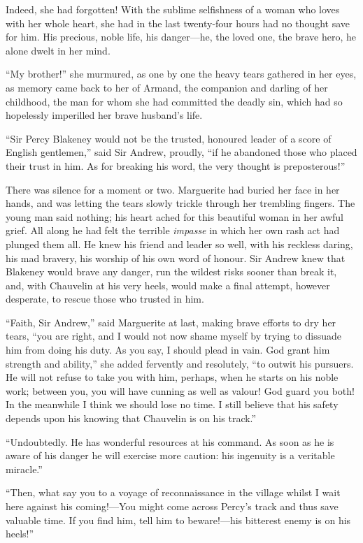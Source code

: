 \documentclass[paper=a5,BCOR=7mm,twoside,DIV=calc,12pt,usegeometry,chapterprefix,endperiod,headings=big]{scrbook}
\begin{document}
Indeed, she had forgotten! With the sublime selfishness of a woman who loves with her whole heart, she had in the last twenty-four hours had no thought save for him. His precious, noble life, his danger---he, the loved one, the brave hero, he alone dwelt in her mind.

\enquote{My brother!} she murmured, as one by one the heavy tears gathered in her eyes, as memory came back to her of Armand, the companion and darling of her childhood, the man for whom she had committed the deadly sin, which had so hopelessly imperilled her brave husband's life.

\enquote{Sir Percy Blakeney would not be the trusted, honoured leader of a score of English gentlemen,} said Sir Andrew, proudly, \enquote{if he abandoned those who placed their trust in him. As for breaking his word, the very thought is preposterous!}

There was silence for a moment or two. Marguerite had buried her face in her hands, and was letting the tears slowly trickle through her trembling fingers. The young man said nothing; his heart ached for this beautiful woman in her awful grief. All along he had felt the terrible \textit{impasse} in which her own rash act had plunged them all. He knew his friend and leader so well, with his reckless daring, his mad bravery, his worship of his own word of honour. Sir Andrew knew that Blakeney would brave any danger, run the wildest risks sooner than break it, and, with Chauvelin at his very heels, would make a final attempt, however desperate, to rescue those who trusted in him.

\enquote{Faith, Sir Andrew,} said Marguerite at last, making brave efforts to dry her tears, \enquote{you are right, and I would not now shame myself by trying to dissuade him from doing his duty. As you say, I should plead in vain. God grant him strength and ability,} she added fervently and resolutely, \enquote{to outwit his pursuers. He will not refuse to take you with him, perhaps, when he starts on his noble work; between you, you will have cunning as well as valour! God guard you both! In the meanwhile I think we should lose no time. I still believe that his safety depends upon his knowing that Chauvelin is on his track.}

\enquote{Undoubtedly. He has wonderful resources at his command. As soon as he is aware of his danger he will exercise more caution: his ingenuity is a veritable miracle.}

\enquote{Then, what say you to a voyage of reconnaissance in the village whilst I wait here against his coming!---You might come across Percy's track and thus save valuable time. If you find him, tell him to beware!---his bitterest enemy is on his heels!}
\end{document}
